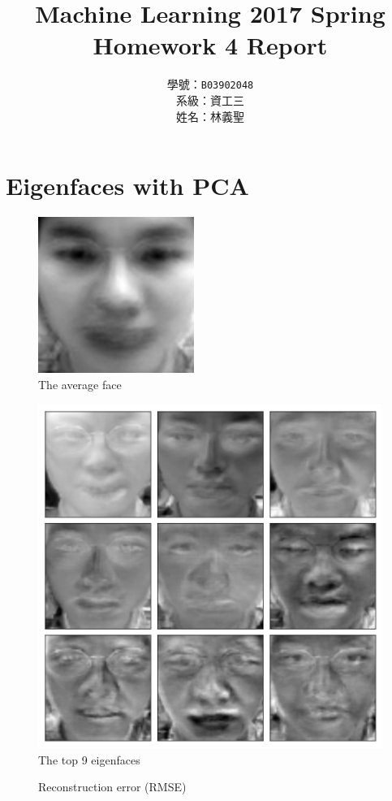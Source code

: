 \documentclass[12pt,a4paper]{extarticle}
\title{Machine Learning 2017 Spring\\Homework 4 Report}
\author{學號：\texttt{B03902048}\\系級：資工三\\姓名：林義聖}
\date{}
\begin{document}
\maketitle

\section{Eigenfaces with PCA}

\begin{figure}[ht]
  \centering
  \includegraphics[width=0.4\linewidth]{average-face.png}
  \caption{The average face}
  \label{fig:average-face}
\end{figure}

\begin{figure}[ht]
  \centering
  \includegraphics[width=0.6\linewidth]{eigen-faces-top-9.png}
  \caption{The top 9 eigenfaces}
  \label{fig:top-9-eigenfaces}
\end{figure}

\begin{figure}[ht]
  \centering
  \caption{Reconstruction error (RMSE)}
  \label{fig:eigenfaces-error-rate}
\end{figure}
\end{document}
